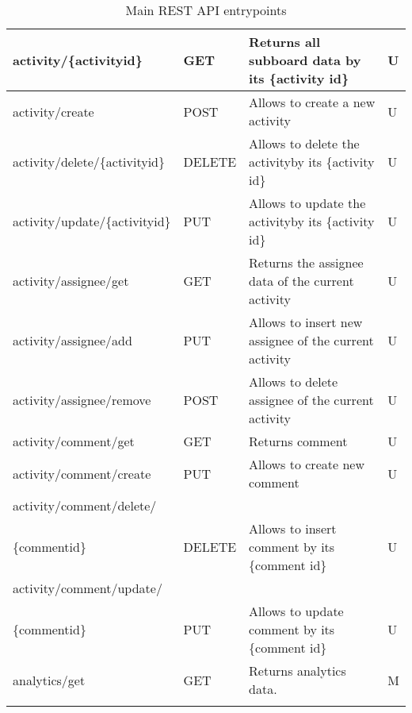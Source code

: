 \begin{longtable}{|p{}|p{} |p{}|p{}|}
activity/\{activityid\}                 & GET    & Returns all subboard data by its  \{activity id\} & U \\ \hline
activity/create                         & POST   & Allows to create a new activity & U \\ \hline
activity/delete/\{activityid\}          & DELETE & Allows to delete the activityby its \{activity id\} & U \\ \hline
activity/update/\{activityid\}          & PUT    & Allows to update the activityby its \{activity id\}  & U \\ \hline
activity/assignee/get                   & GET    & Returns the assignee data of the current activity & U \\ \hline
activity/assignee/add                   & PUT    & Allows to insert new assignee of the current activity & U \\ \hline
activity/assignee/remove                & POST   & Allows to delete assignee of the current activity & U \\ \hline
activity/comment/get                    & GET    & Returns comment  & U \\ \hline
activity/comment/create                 & PUT    & Allows to create new comment & U \\ \hline
activity/comment/delete/\\\{commentid\}   & DELETE & Allows to insert comment by its \{comment id\} & U \\ \hline
activity/comment/update/\\\{commentid\}   & PUT    & Allows to update comment by its \{comment id\}  & U \\ \hline
analytics/get                           & GET    & Returns analytics data. & M \\ \hline
\caption{Main REST API entrypoints}



\label{tab:termGlossary}
\end{longtable}